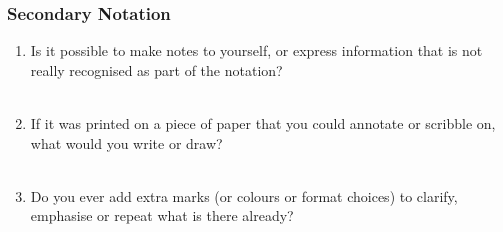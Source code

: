 \documentclass[14pt]{article}
\newcommand{\answerbox}{
\fbox{
\begin{minipage}{16cm}
\hfill\vspace{2cm}
\end{minipage}
}\\
}
\begin{document}
%

\subsubsection{Secondary Notation}

\begin{enumerate}
\item Is it possible to make notes to yourself, or express information that is not really recognised as part of the notation?\\
\answerbox
\item If it was printed on a piece of paper that you could annotate or scribble on, what would you write or draw?\\
\answerbox
\item Do you ever add extra marks (or colours or format choices) to clarify, emphasise or repeat what is there already?\\ %
\answerbox
\end{enumerate}

%
\end{document}
